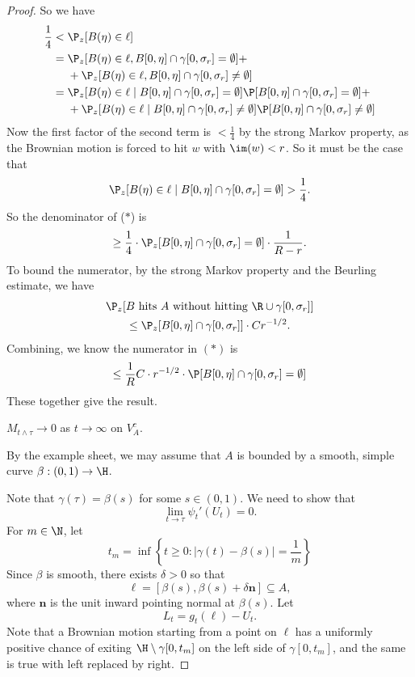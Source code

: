 \documentclass[a4paper]{article}
\begin{document}
\begin{proof}
  So we have
  \begin{align*}
    \frac{1}{4} &< \P_z[B(\eta) \in \ell]\\
    &= \P_z[B(\eta) \in \ell, B[0, \eta] \cap \gamma[0, \sigma_r] = \emptyset] +\\
    &\hphantom{{}={}}+\P_z[B(\eta) \in \ell, B[0, \eta] \cap \gamma[0, \sigma_r] \not= \emptyset]\\
    &= \P_z[B(\eta) \in \ell \mid B[0, \eta] \cap \gamma[0, \sigma_r] = \emptyset] \P[B[0, \eta] \cap \gamma[0, \sigma_r] = \emptyset] +\\
    &\hphantom{{}={}}+\P_z[B(\eta) \in \ell \mid B[0, \eta] \cap \gamma[0, \sigma_r] \not= \emptyset]\P[ B[0, \eta] \cap \gamma[0, \sigma_r] \not= \emptyset]
  \end{align*}
  Now the first factor of the second term is $< \frac{1}{4}$ by the strong Markov property, as the Brownian motion is forced to hit $w$ with $\im(w) < r$. So it must be the case that
  \[
    \P_z[B(\eta) \in \ell \mid B[0, \eta] \cap \gamma[0, \sigma_r] = \emptyset] > \frac{1}{4}.
  \]
  So the denominator of ($*$) is
  \[
    \geq \frac{1}{4}\cdot \P_z[B[0, \eta] \cap \gamma[0, \sigma_r] = \emptyset] \cdot \frac{1}{R -r }.
  \]
  To bound the numerator, by the strong Markov property and the Beurling estimate, we have
  \begin{multline*}
    \P_z[B\text{ hits $A$ without hitting }\R \cup \gamma[0, \sigma_r]]\\
    \leq \P_z[B[0, \eta] \cap \gamma[0, \sigma_r]] \cdot C r^{-1/2}.
  \end{multline*}
  Combining, we know the numerator in $(*)$ is
  \[
    \leq \frac{1}{R} C \cdot r^{-1/2} \cdot \P[B[0, \eta] \cap \gamma[0, \sigma_r] = \emptyset]
  \]
  These together give the result.

  \begin{claim}
    $M_{t \wedge \tau} \to 0$ as $t \to \infty$ on $V_A^c$.
  \end{claim}
  By the example sheet, we may assume that $A$ is bounded by a smooth, simple curve $\beta: (0, 1) \to \H$.

  Note that $\gamma(\tau) = \beta(s)$ for some $s \in (0, 1)$. We need to show that
  \[
    \lim_{t \to \tau} \psi_t'(U_t) = 0.
  \]
  For $m \in \N$, let
  \[
    t_m = \inf \left\{t \geq 0 : |\gamma(t) - \beta(s)| = \frac{1}{m}\right\}
  \]
  Since $\beta$ is smooth, there exists $\delta > 0$ so that
  \[
    \ell = [\beta (s), \beta(s) + \delta \mathbf{n}] \subseteq A,
  \]
  where $\mathbf{n}$ is the unit inward pointing normal at $\beta(s)$. Let
  \[
    L_t = g_t(\ell) - U_t.
  \]
  Note that a Brownian motion starting from a point on $\ell$ has a uniformly positive chance of exiting $\H \setminus \gamma[0 ,t_m]$ on the left side of $\gamma[0, t_m]$, and the same is true with left replaced by right.


\end{proof}
\end{document}

